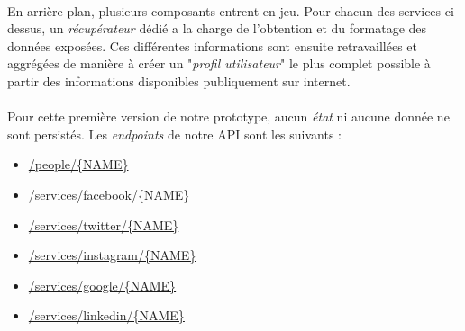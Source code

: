 \paragraph{} En arrière plan, plusieurs composants entrent en jeu. Pour chacun des services
ci-dessus, un \emph{récupérateur} dédié a la charge de l'obtention et du formatage des données
exposées. Ces différentes informations sont ensuite retravaillées et aggrégées de manière 
à créer un "\emph{profil utilisateur}" le plus complet possible à partir des informations
disponibles publiquement sur internet.

\paragraph{} Pour cette première version de notre prototype, aucun \emph{état} ni aucune
donnée ne sont persistés. Les \emph{endpoints} de notre API sont les suivants :

\begin{itemize}
    \item \url{/people/{NAME}}
    \item \url{/services/facebook/{NAME}}
    \item \url{/services/twitter/{NAME}}
    \item \url{/services/instagram/{NAME}}
    \item \url{/services/google/{NAME}}
    \item \url{/services/linkedin/{NAME}}
\end{itemize}